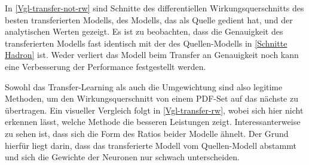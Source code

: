 In \textsf{\autoref{Vgl-transfer-not-rw}} sind Schnitte des differentiellen Wirkungsquerschnitts des besten transferierten Modells, des Modells, das als Quelle gedient hat, und der analytischen Werten gezeigt. Es ist zu beobachten, dass die Genauigkeit des transferierten Modells fast identisch mit der des Quellen-Modells in \textsf{\autoref{Schnitte Hadron}} ist. Weder verliert das Modell beim Transfer an Genauigkeit noch kann eine Verbesserung der Performance festgestellt werden.

Sowohl das Transfer-Learning als auch die Umgewichtung sind also legitime Methoden, um den Wirkungsquerschnitt von einem PDF-Set auf das nächste zu übertragen. Ein visueller Vergleich folgt in \textsf{\autoref{Vgl-transfer-rw}}, wobei sich hier nicht erkennen lässt, welche Methode die besseren Leistungen zeigt. Interessanterweise zu sehen ist, dass sich die Form des Ratios beider Modelle ähnelt. Der Grund hierfür liegt darin, dass das transferierte Modell vom Quellen-Modell abstammt und sich die Gewichte der Neuronen nur schwach unterscheiden.

